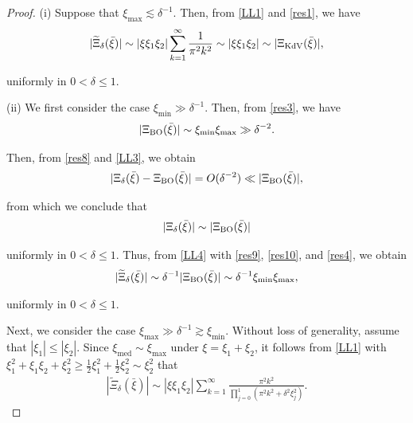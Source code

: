 \documentclass[10pt,a4paper]{amsart}
\newcommand{\BO}{\text{\rm BO} }
\newcommand{\KDV}{\text{\rm KdV} }
\newcommand{\dl}{\delta}
\newcommand{\ges}{\gtrsim}
\newcommand{\les}{\lesssim}
\DeclareMathOperator{\med}{med}
\newcommand{\noi}{\noindent}
\newcommand{\wt}{\widetilde}
\begin{document}
\begin{proof}
(i) 
Suppose that  $\xi_{\max} \les \dl^{-1}$.
Then,  from \eqref{LL1} and \eqref{res1}, we have
\begin{align*}
|\wt \Xi_\dl(\bar \xi)|
\sim  |\xi \xi_1 \xi_2|
 \sum_{k=1}^{\infty}   
 \frac1{\pi^2 k^2}
\sim  |\xi \xi_1 \xi_2|
\sim |\Xi_\KDV(\bar \xi)|, 
\end{align*}

\noi
uniformly in $0 < \dl \le 1$.






\medskip

\noi
(ii)
We first consider the case  $ \xi_{\min} \gg \dl^{-1}$.
Then,  from \eqref{res3}, 
 we have
\begin{align}
|\Xi_\BO(\bar \xi)|\sim \xi_{\min}\xi_{\max} \gg \dl^{-2}.
\label{LL3}
\end{align}

\noi
Then, 
from 
  \eqref{res8} and  \eqref{LL3}, 
we obtain
\begin{align*}
|\Xi_\dl(\bar \xi) - \Xi_\BO(\bar \xi)| = O(\dl^{-2}) \ll 
 |\Xi_\BO(\bar \xi)|, 
\end{align*}


\noi
from which we conclude that 
\begin{align}
|\Xi_\dl(\bar \xi)|\sim | \Xi_\BO(\bar \xi)|
\label{LL4}
\end{align}

\noi
uniformly in $0 < \dl \le 1$.
Thus, from 
\eqref{LL4} with 
\eqref{res9},  \eqref{res10}, 
and  \eqref{res4},
we obtain
\begin{align*}
|\wt \Xi_\dl(\bar \xi)|\sim \dl^{-1} | \Xi_\BO(\bar \xi)|
\sim    \dl^{-1} \xi_{\min}\xi_{\max}, 
\end{align*}

\noi
uniformly in $0 < \dl \le 1$.


Next, we consider the case
  $\xi_{\max} \gg    \dl^{-1} \ges  \xi_{\min}$.
Without loss of generality, 
assume that $|\xi_1|\le |\xi_2|$.
Since $\xi_{\med} \sim \xi_{\max}$ under $\xi = \xi_1 + \xi_2$, 
it follows from 
 \eqref{LL1} with 
 $\xi_1^2 + \xi_1 \xi_2 + \xi_2^2 \ge
\frac 12  \xi_1^2 + \frac 12 \xi_2^2
\sim \xi_2^2$ that 
\begin{align*}
|\wt \Xi_\dl(\bar \xi)|
\sim |\xi \xi_1 \xi_2|
 \sum_{k=1}^{\infty}   
 \frac{ \pi^2 k^2 }
 {\prod_{j = 0}^1(\pi^2k^2  +\dl^2\xi_j^2)}.
\end{align*}


\end{proof}
\end{document}

